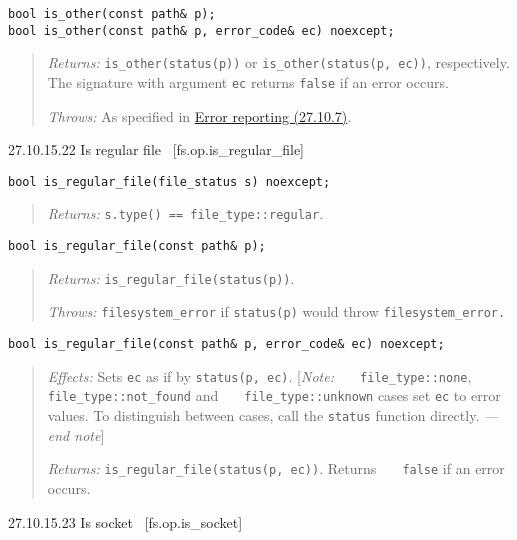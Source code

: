 \begin{verbatim}
bool is_other(const path& p);
bool is_other(const path& p, error_code& ec) noexcept;
\end{verbatim}

\begin{quote}
\emph{Returns:} \texttt{is\_other(status(p))} or
\texttt{is\_other(status(p,\ ec))}, respectively. The signature with
argument \texttt{ec} returns \texttt{false} if an error occurs.

\emph{Throws:} As specified in \hyperref[Error-reporting]{Error
reporting (27.10.7)}.
\end{quote}

27.10.15.22 Is regular file~ {[}fs.op.is\_regular\_file{]}

\begin{verbatim}
bool is_regular_file(file_status s) noexcept;
\end{verbatim}

\begin{quote}
\emph{Returns:} \texttt{s.type()\ ==\ file\_type::regular}.
\end{quote}

\begin{verbatim}
bool is_regular_file(const path& p);
\end{verbatim}

\begin{quote}
\emph{Returns:} \texttt{is\_regular\_file(status(p))}.

\emph{Throws:} \texttt{filesystem\_error} if \texttt{status(p)} would
throw \texttt{filesystem\_error.}
\end{quote}

\begin{verbatim}
bool is_regular_file(const path& p, error_code& ec) noexcept;
\end{verbatim}

\begin{quote}
\emph{Effects:} Sets \texttt{ec} as if by \texttt{status(p,\ ec)}.
{[}\emph{Note:} \texttt{\ \ \ file\_type::none},
\texttt{file\_type::not\_found} and \texttt{\ \ \ file\_type::unknown}
cases set \texttt{ec} to error values. To distinguish between cases,
call the \texttt{status} function directly. \emph{---end note}{]}

\emph{Returns:} \texttt{is\_regular\_file(status(p,\ ec))}. Returns
\texttt{\ \ \ false} if an error occurs.
\end{quote}

27.10.15.23 Is socket~ {[}fs.op.is\_socket{]}

